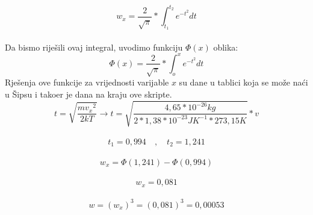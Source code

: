 \documentclass[a4paper,12pt]{article}
\begin{document}
\\
$$ w_x=\frac{2}{\sqrt{\pi}}*\int_{t_1}^{t_2}e^{{-t}^2}dt $$
\\
Da bismo rije\v{s}ili ovaj integral, uvodimo funkciju $\Phi(x)$ oblika: 
$$ \Phi(x)=\frac{2}{\sqrt{\pi}}*\int_{o}^{x}e^{{-t}^2}dt $$
Rje\v{s}enja ove funkcije za vrijednosti varijable $x$ su dane u tablici koja se mo\v{z}e na\'ci u \v{S}ipsu\cite{statisticka} i tako\dj er je dana na kraju ove skripte.
\\
$$ t=\sqrt{\frac{m{v_x}^2}{2kT}} \rightarrow t=\sqrt{\frac{4,65*10^{-26}kg}{2*1,38*10^{-23}JK^{-1}*273,15K}}*v $$
\\
$$ t_1=0,994 \quad,\quad t_2=1,241 $$
\\
$$ w_x=\Phi(1,241)-\Phi(0,994) $$
\\
$$ w_x=0,081 $$
\\
$$ w=(w_x)^3=(0,081)^3=0,00053 $$
\end{document}
